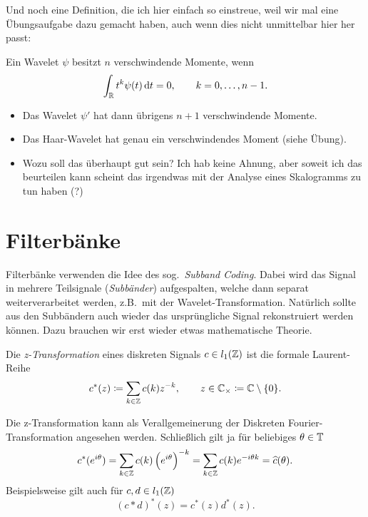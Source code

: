 Und noch eine Definition, die ich hier einfach so einstreue, weil wir mal eine Übungsaufgabe dazu
gemacht haben, auch wenn dies nicht unmittelbar hier her passt:

\begin{definition}
Ein Wavelet $ \psi $ besitzt $ n $ verschwindende Momente, wenn
\[
  \int_{\R} t^{k} \psi(t) \dif t = 0, \qquad k = 0, \ldots, n-1.
\]
\end{definition}

\begin{remark}\leavevmode
\begin{itemize}
\item Das Wavelet $ \psi' $ hat dann übrigens $ n + 1 $ verschwindende Momente.
\item Das Haar-Wavelet hat genau ein verschwindendes Moment (siehe Übung).
\item Wozu soll das überhaupt gut sein? Ich hab keine Ahnung, aber soweit ich das beurteilen kann
  scheint das irgendwas mit der Analyse eines Skalogramms zu tun haben (?)
\end{itemize}
\end{remark}

\section{Filterbänke}

Filterbänke verwenden die Idee des sog.\ \emph{Subband Coding}. Dabei wird das Signal in mehrere
Teilsignale (\emph{Subbänder}) aufgespalten, welche dann separat weiterverarbeitet werden, z.B.\ 
mit der Wavelet-Transformation. Natürlich sollte aus den Subbändern auch wieder das ursprüngliche
Signal rekonstruiert werden können. Dazu brauchen wir erst wieder etwas mathematische Theorie.

\begin{definition}[z-Transformation]
Die \emph{z-Transformation} eines diskreten Signals $ c \in l_{1}(\mathbb{Z}) $ ist die formale 
Laurent-Reihe
\[
  c^{*}(z) \coloneqq \sum_{k \in \mathbb{Z}} c(k) z^{-k}, 
    \qquad z \in \mathbb{C}_{\times} \coloneqq \mathbb{C} \setminus \{ 0 \}.
\]
\end{definition}

\begin{remark}[z-Transformation]
Die z-Transformation kann als Verallgemeinerung der Diskreten Fourier-Transformation angesehen 
werden. Schließlich gilt ja für beliebiges $ \theta \in \mathbb{T} $
\[
    c^{*}(e^{i\theta})
  = \sum_{k \in \mathbb{Z}} c(k) \left( e^{i\theta} \right)^{-k}
  = \sum_{k \in \mathbb{Z}} c(k) e^{-i\theta k}
  = \widehat{c}(\theta).
\]
Beispielsweise gilt auch für $ c, d \in l_{1}(\mathbb{Z}) $
\[
  (c * d)^{*}(z) = c^{*}(z) d^{*}(z).
\]
\end{remark}

